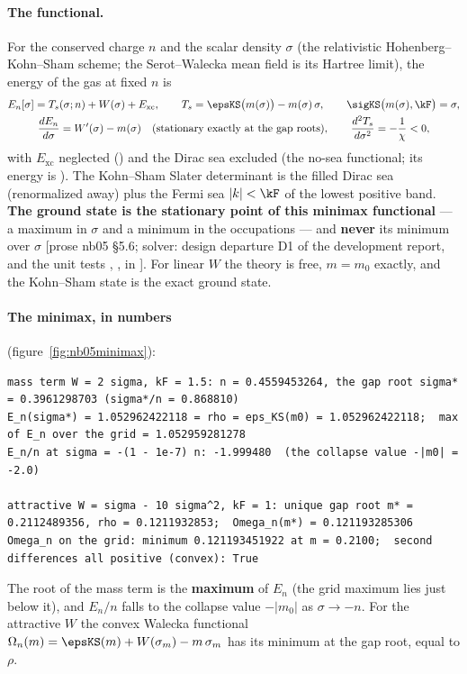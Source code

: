 \paragraph{The functional.} For the conserved charge $n$ and the scalar density $\sigma$ (the
relativistic Hohenberg--Kohn--Sham scheme; the Serot--Walecka mean field is its Hartree limit), the
energy of the gas at fixed $n$ is
\begin{gather*}
  E_n[\sigma]=T_s(\sigma;n)+W(\sigma)+E_{\mathrm{xc}},\qquad T_s=\epsKS\bigl(m(\sigma)\bigr)-m(\sigma)\,\sigma,\qquad
  \sigKS\bigl(m(\sigma),\kF\bigr)=\sigma,\\
  \frac{dE_n}{d\sigma}=W'(\sigma)-m(\sigma)\quad\text{(stationary exactly at the gap roots)},\qquad
  \frac{d^2T_s}{d\sigma^2}=-\frac1\chi<0,
\end{gather*}
with $E_{\mathrm{xc}}$ neglected () and the Dirac sea excluded (the no-sea functional; its
energy is ). The Kohn--Sham Slater determinant is the filled Dirac sea (renormalized
away) plus the Fermi sea $|k|<\kF$ of the lowest positive band. \textbf{The ground state is the stationary
point of this minimax functional} --- a maximum in $\sigma$ and a minimum in the occupations --- and
\textbf{never} its minimum over $\sigma$ [prose nb05 \S5.6; solver: design departure D1 of the
development report, and the unit tests
,
,
 in ]. For
linear $W$ the theory is free, $m=m_0$ exactly, and the Kohn--Sham state is the exact ground state.

\paragraph{The minimax, in numbers}  (figure~\ref{fig:nb05minimax}):
\begin{Verbatim}[fontsize=\scriptsize]
mass term W = 2 sigma, kF = 1.5: n = 0.4559453264, the gap root sigma* = 0.3961298703 (sigma*/n = 0.868810)
E_n(sigma*) = 1.052962422118 = rho = eps_KS(m0) = 1.052962422118;  max of E_n over the grid = 1.052959281278
E_n/n at sigma = -(1 - 1e-7) n: -1.999480  (the collapse value -|m0| = -2.0)

attractive W = sigma - 10 sigma^2, kF = 1: unique gap root m* = 0.2112489356, rho = 0.1211932853;  Omega_n(m*) = 0.121193285306
Omega_n on the grid: minimum 0.121193451922 at m = 0.2100;  second differences all positive (convex): True
\end{Verbatim}
The root of the mass term is the \textbf{maximum} of $E_n$ (the grid maximum lies just below it), and
$E_n/n$ falls to the collapse value $-|m_0|$ as $\sigma\to-n$. For the attractive $W$ the convex Walecka
functional $\Omega_n(m)=\epsKS(m)+W(\sigma_m)-m\,\sigma_m$ has its minimum at the gap root, equal to $\rho$.

